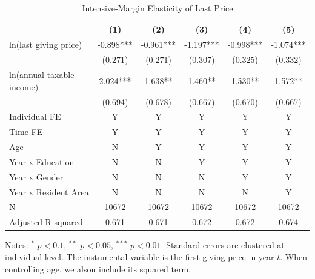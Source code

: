 \documentclass[
  11pt,
  a4paper,
]{article}
\begin{document}
\begin{table}

\caption{\label{tab:LastIntensive}Intensive-Margin Elasticity of Last Price}
\centering
\fontsize{9}{11}\selectfont
\begin{threeparttable}
\begin{tabular}[t]{lccccc}
\toprule
 & (1) & (2) & (3) & (4) & (5)\\
\midrule
ln(last giving price) & -0.898*** & -0.961*** & -1.197*** & -0.998*** & -1.074***\\
 & (0.271) & (0.271) & (0.307) & (0.325) & (0.332)\\
ln(annual taxable income) & 2.024*** & 1.638** & 1.460** & 1.530** & 1.572**\\
 & (0.694) & (0.678) & (0.667) & (0.670) & (0.667)\\
Individual FE & Y & Y & Y & Y & Y\\
Time FE & Y & Y & Y & Y & Y\\
Age & N & Y & Y & Y & Y\\
Year x Education & N & N & Y & Y & Y\\
Year x Gender & N & N & N & Y & Y\\
Year x Resident Area & N & N & N & N & Y\\
N & 10672 & 10672 & 10672 & 10672 & 10672\\
Adjusted R-squared & 0.671 & 0.671 & 0.672 & 0.672 & 0.674\\
\bottomrule
\end{tabular}
\begin{tablenotes}
\item Notes: $^{*}$ $p < 0.1$, $^{**}$ $p < 0.05$, $^{***}$ $p < 0.01$. Standard errors are clustered at individual level. The instumental variable is the first giving price in year $t$. When controlling age, we alson include its squared term.
\end{tablenotes}
\end{threeparttable}
\end{table}
\end{document}

